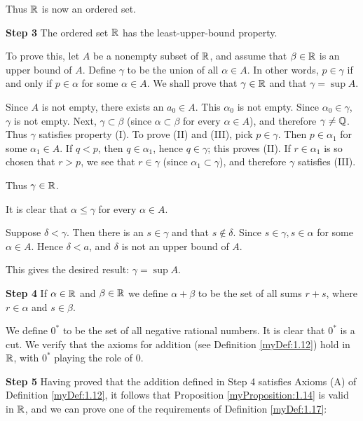 Thus ${\protect\mathbb R}$ is now an ordered set.


\textbf{Step 3}
The ordered set ${\protect\mathbb R}$ has the least-upper-bound property.

To prove this, let $A$ be a nonempty subset of ${\protect\mathbb R}$, 
and assume that $\beta \in {\protect\mathbb R}$ is an upper bound of $A$. 
Define $\gamma$ to be the union of all $\alpha \in A$. 
In other words, $p \in \gamma$ if and only if $p \in \alpha$ for some $\alpha \in A$. 
We shall prove that $\gamma \in {\protect\mathbb R}$ and that $\gamma = \sup A$.

Since $A$ is not empty, there exists an $a_0 \in A$. 
This $\alpha_0$ is not empty. 
Since $\alpha_0 \in \gamma$, $\gamma$ is not empty. 
Next, $\gamma \subset \beta$ 
(since $\alpha \subset \beta$ for every $\alpha \in A$), 
and therefore $\gamma \neq {\protect\mathbb Q}$. 
Thus $\gamma$ satisfies property (I). 
To prove (II) and (III), pick $p \in \gamma$. 
Then $p \in \alpha_1$ for some $\alpha_1 \in A$. 
If $q <p$, then $q \in \alpha_1$, hence $q \in \gamma$; this proves (II). 
If $r \in \alpha_1$ is so chosen that $r > p$, 
we see that $r\in \gamma$ (since $\alpha_1 \subset \gamma$), 
and therefore $\gamma$ satisfies (III).

Thus $\gamma \in {\protect\mathbb R}$.

It is clear that $\alpha \leq \gamma$ for every $\alpha \in A$.

Suppose $\delta < \gamma$. 
Then there is an $s \in \gamma$ and that $s \not\in \delta$. 
Since $s \in \gamma, s \in \alpha$ for some $\alpha \in A$. 
Hence $\delta <a$, and $\delta$ is not an upper bound of $A$.

This gives the desired result: $\gamma = \sup A$.


\textbf{Step 4} 
If $\alpha \in {\protect\mathbb R}$ and $\beta \in {\protect\mathbb R}$ 
we define $\alpha + \beta$ to be the set of all sums $r + s$, 
where $r \in \alpha$ and $s \in \beta$.

We define $0^*$ to be the set of all negative rational numbers. 
It is clear that $0^*$ is a cut. 
We verify that the axioms for addition 
(see Definition \ref{myDef:1.12}) 
hold in ${\protect\mathbb R}$, with $0^*$ playing the role of $0$.

\textbf{Step 5} 
Having proved that the addition defined in Step 4 satisfies Axioms (A) of Definition \ref{myDef:1.12}, 
it follows that Proposition \ref{myProposition:1.14} is valid in ${\protect\mathbb R}$, and we can
prove one of the requirements of Definition \ref{myDef:1.17}:

